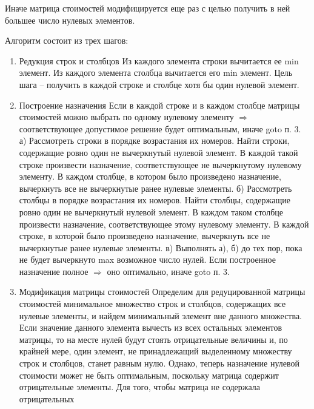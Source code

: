 \documentclass[17pt]{extarticle}
\begin{document}
Иначе матрица стоимостей модифицируется еще раз с целью
получить в ней большее число нулевых элементов.

Алгоритм состоит из трех шагов:
\begin{enumerate}
    \item Редукция строк и столбцов
          \subitem Из каждого элемента строки вычитается ее min элемент.
          \subitem Из каждого элемента столбца вычитается его min элемент.
          \subitem Цель шага – получить в каждой строке и столбце хотя бы один нулевой элемент.
    \item Построение назначения
          Если в каждой строке и в каждом столбце матрицы стоимостей можно
          выбрать по одному нулевому элементу $\Rightarrow$ соответствующее
          допустимое решение будет оптимальным, иначе goto п. 3.
          а) Рассмотреть строки в порядке возрастания их номеров.
          Найти строки, содержащие ровно один не вычеркнутый нулевой
          элемент.
          В каждой такой строке произвести назначение, соответствующее не
          вычеркнутому нулевому элементу.
          В каждом столбце, в котором было произведено назначение,
          вычеркнуть все не вычеркнутые ранее нулевые элементы.
          б) Рассмотреть столбцы в порядке возрастания их номеров.
          Найти столбцы, содержащие ровно один не вычеркнутый
          нулевой элемент.
          В каждом таком столбце произвести назначение,
          соответствующее этому нулевому элементу.
          В каждой строке, в которой было произведено назначение,
          вычеркнуть все не вычеркнутые ранее нулевые элементы.
          в) Выполнять а), б) до тех пор, пока не будет вычеркнуто max
          возможное число нулей.
          Если построенное назначение полное $\Rightarrow$ оно оптимально, иначе
          goto п. 3.
    \item Модификация матрицы стоимостей
          \subitem Определим для редуцированной матрицы стоимостей минимальное
          множество строк и столбцов, содержащих все нулевые элементы, и
          найдем минимальный элемент вне данного множества.
          \subitem Если значение данного элемента вычесть из всех остальных
          элементов матрицы, то на месте нулей будут стоять отрицательные
          величины и, по крайней мере, один элемент, не принадлежащий
          выделенному множеству строк и столбцов, станет равным нулю.
          Однако, теперь назначение нулевой стоимости может не быть
          оптимальным, поскольку матрица содержит отрицательные
          элементы. Для того, чтобы матрица не содержала отрицательных

\end{enumerate}
\end{document}
